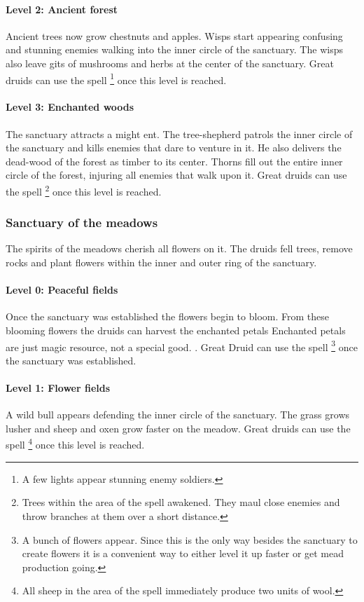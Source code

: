 \documentclass[a4paper]{book}
\begin{document}
\paragraph{Level 2: Ancient forest}
Ancient trees now grow chestnuts and apples. Wisps start appearing confusing
and stunning enemies walking into the inner circle of the sanctuary. The wisps
also leave gits of mushrooms and herbs at the center of the sanctuary. Great
druids can use the spell \footnote{ A few lights appear
	stunning enemy soldiers. } once this level is reached.

\paragraph{Level 3: Enchanted woods}
The sanctuary attracts a might ent. The tree-shepherd patrols the inner circle
of the sanctuary and kills enemies that dare to venture in it. He also delivers
the dead-wood of the forest as timber to its center. Thorns fill out the entire
inner circle of the forest, injuring all enemies that walk upon it. Great
druids can use the spell \footnote{ Trees within
	the area of the spell awakened. They maul close enemies and throw branches at
	them over a short distance. } once this level is reached.

\subsubsection{Sanctuary of the meadows}
The spirits of the meadows cherish all flowers on it. The druids fell trees,
remove rocks and plant flowers within the inner and outer ring of the
sanctuary.

\paragraph{Level 0: Peaceful fields}
Once the sanctuary was established the flowers begin to bloom. From these
blooming flowers the druids can harvest the enchanted petals{ Enchanted petals
		are just magic resource, not a special good. }. Great Druid can use the spell
\footnote{ A bunch of flowers appear. Since this is the only
	way besides the sanctuary to create flowers it is a convenient way to either
	level it up faster or get mead production going. } once the sanctuary was
established.

\paragraph{Level 1: Flower fields}
A wild bull appears defending the inner circle of the sanctuary. The grass
grows lusher and sheep and oxen grow faster on the meadow. Great druids can use
the spell \footnote{ All sheep in the area of the
	spell immediately produce two units of wool. } once this level is reached.
\end{document}
